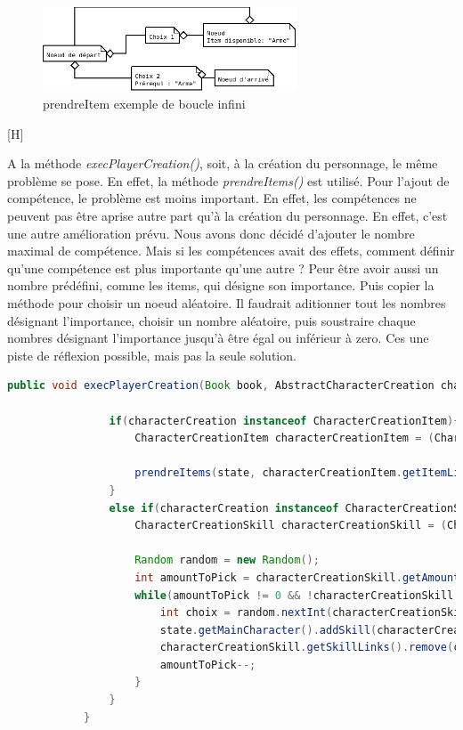		\begin{figure}[H]
			\centering\includegraphics[height=2.5cm, keepaspectratio]{img/fourmisPrendreItemInfiniExemple.png}
			\caption{prendreItem exemple de boucle infini}
		\end{figure}[H]

		A la méthode \textit{execPlayerCreation()}, soit, à la création du personnage, le même problème se pose. En effet, la méthode \textit{prendreItems()} est utilisé. Pour l'ajout de compétence, le problème est moins important. En effet, les compétences ne peuvent pas être aprise autre part qu'à la création du personnage. En effet, c'est une autre amélioration prévu. Nous avons donc décidé d'ajouter le nombre maximal de compétence. Mais si les compétences avait des effets, comment définir qu'une compétence est plus importante qu'une autre ? Peur être avoir aussi un nombre prédéfini, comme les items, qui désigne son importance. Puis copier la méthode pour choisir un noeud aléatoire. Il faudrait aditionner tout les nombres désignant l'importance, choisir un nombre aléatoire, puis soustraire chaque nombres désignant l'importance jusqu'à être égal ou inférieur à zero. Ces une piste de réflexion possible, mais pas la seule solution.

		\begin{lstlisting}[gobble=12, language=java, caption=execPlayerCreation() de Fourmis]
			public void execPlayerCreation(Book book, AbstractCharacterCreation characterCreation, BookState state) {

				if(characterCreation instanceof CharacterCreationItem){
					CharacterCreationItem characterCreationItem = (CharacterCreationItem) characterCreation;

					prendreItems(state, characterCreationItem.getItemLinks(), characterCreationItem.getAmountToPick());
				}
				else if(characterCreation instanceof CharacterCreationSkill){
					CharacterCreationSkill characterCreationSkill = (CharacterCreationSkill) characterCreation;

					Random random = new Random();
					int amountToPick = characterCreationSkill.getAmountToPick();
					while(amountToPick != 0 && !characterCreationSkill.getSkillLinks().isEmpty()) {
						int choix = random.nextInt(characterCreationSkill.getSkillLinks().size());
						state.getMainCharacter().addSkill(characterCreationSkill.getSkillLinks().get(choix));
						characterCreationSkill.getSkillLinks().remove(choix);
						amountToPick--;
					}
				}
			}
		\end{lstlisting}

